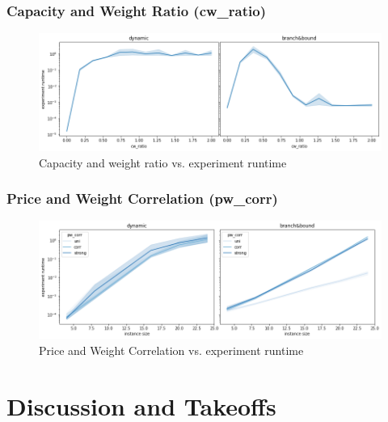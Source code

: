 \documentclass[a4paper,10pt]{article}
\begin{document}
\subsubsection{Capacity and Weight Ratio (cw\_ratio)}

\begin{figure}[!htb]
	\centering
  	\includegraphics[width=\textwidth]{images/cwratio.png}
	\caption{Capacity and weight ratio vs. experiment runtime}
	\label{cwratio}
\end{figure}

\subsubsection{Price and Weight Correlation (pw\_corr)}

\begin{figure}[!htb]
	\centering
  	\includegraphics[width=\textwidth]{images/pwcorr.png}
	\caption{Price and Weight Correlation vs. experiment runtime}
	\label{pwcorr}
\end{figure}

\section{Discussion and Takeoffs}
\end{document}
